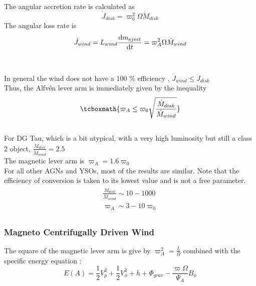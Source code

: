 \documentclass[10pt,a4paper,english]{article}
\begin{document}
The angular accretion rate is calculated as
\begin{equation}
   \dot{J}_{disk} = \varpi^{2}_{0} \Omega \dot{M}_{disk}
\end{equation}
The angular loss rate is
\begin{equation}
   \dot{J}_{wind} = L_{wind} \frac{\mathrm{d}{m_{eject}}}{\mathrm{d}{t}}= \varpi^{2}_{A} \Omega \dot{M}_{wind}
\end{equation}
\\
\\
In general the wind does not have a 100 $\%$ efficiency , $\dot{J}_{wind} \leq \dot{J}_{disk}$
\\
Thus, the Alfvén lever arm is immediately given by the inequality
\begin{equation}
    \tcboxmath{
     \varpi_{A} \leq \varpi_{0} \sqrt{\frac{\dot{M}_{disk}}{\dot{M}_{wind}}}
    }
\end{equation}
\\
For DG Tau, which is a bit atypical, with a very high luminosity but still a class 2 object, $\frac{\dot{M}_{disk}}{\dot{M}_{wind}} = 2.5$
\\
The magnetic lever arm is $\varpi_{A} = 1.6 \varpi_{0}$
\\
For all other AGNs and YSOs, most of the results are similar. Note that the efficiency of conversion is taken to its lowest value and is not a free parameter.
\begin{align*}
   \frac{\dot{M}_{disk}}{\dot{M}_{wind}} \sim 10 - 1000 \\
   \varpi_{A} \sim 3-10 \varpi_{0} \\
\end{align*}



\subsubsection{Magneto Centrifugally Driven Wind}

The square of the magnetic lever arm is give by $\varpi^{2}_{A} = \frac{L}{\Omega}$ combined with the specific energy equation :
\begin{equation}
   E(A)=\frac{1}{2}V_{p}^{2} +\frac{1}{2}V_{\phi}^{2} + h + \Phi_{grav} - \frac{\varpi\Omega}{\Psi_{A}}B_{\phi}
\end{equation}

\end{document}
